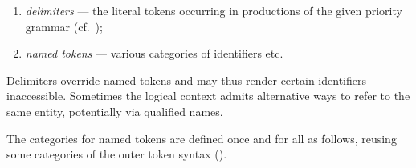 \begin{isabellebody}
\begin{isamarkuptext}
  \begin{enumerate}

  \item \emph{delimiters} --- the literal tokens occurring in
  productions of the given priority grammar (cf.\
  );

  \item \emph{named tokens} --- various categories of identifiers etc.

  \end{enumerate}

  Delimiters override named tokens and may thus render certain
  identifiers inaccessible.  Sometimes the logical context admits
  alternative ways to refer to the same entity, potentially via
  qualified names.

  \medskip The categories for named tokens are defined once and for
  all as follows, reusing some categories of the outer token syntax
  (\secref{sec:outer-lex}).


\end{isamarkuptext}
\end{isabellebody}
